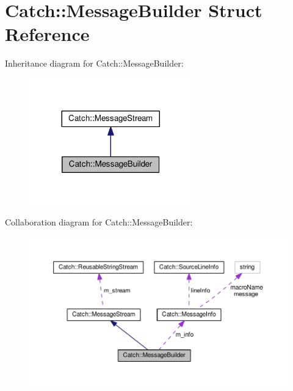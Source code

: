 \hypertarget{structCatch_1_1MessageBuilder}{}\section{Catch\+:\+:Message\+Builder Struct Reference}
\label{structCatch_1_1MessageBuilder}


Inheritance diagram for Catch\+:\+:Message\+Builder\+:
\nopagebreak
\begin{figure}[H]
\begin{center}
\leavevmode
\includegraphics[width=200pt]{structCatch_1_1MessageBuilder__inherit__graph}
\end{center}
\end{figure}


Collaboration diagram for Catch\+:\+:Message\+Builder\+:
\nopagebreak
\begin{figure}[H]
\begin{center}
\leavevmode
\includegraphics[width=350pt]{structCatch_1_1MessageBuilder__coll__graph}
\end{center}
\end{figure}
